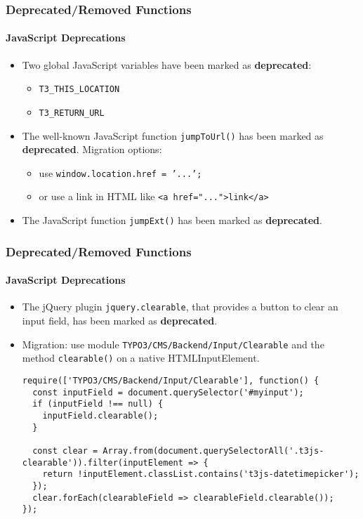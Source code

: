 \begin{frame}[fragile]
	\frametitle{Deprecated/Removed Functions}
	\framesubtitle{JavaScript Deprecations}

	\begin{itemize}
		\item Two global JavaScript variables have been marked as \textbf{deprecated}:

			\begin{itemize}
				\item \texttt{T3\_THIS\_LOCATION}
				\item \texttt{T3\_RETURN\_URL}
			\end{itemize}

		\item The well-known JavaScript function \texttt{jumpToUrl()} has been marked as \textbf{deprecated}.
			Migration options:

			\begin{itemize}
				\item use \texttt{window.location.href = '...';}
				\item or use a link in HTML like \texttt{<a href="...">link</a>}
			\end{itemize}

		\item The JavaScript function \texttt{jumpExt()} has been marked as \textbf{deprecated}.

	\end{itemize}

\end{frame}


\begin{frame}[fragile]
	\frametitle{Deprecated/Removed Functions}
	\framesubtitle{JavaScript Deprecations}

	\lstset{basicstyle=\tiny\ttfamily}

	\begin{itemize}
		\item The jQuery plugin \texttt{jquery.clearable},
			that provides a button to clear an input field, has been marked as \textbf{deprecated}.
		\item Migration: use module \small\texttt{TYPO3/CMS/Backend/Input/Clearable}\normalsize
			and the method \texttt{clearable()} on a native HTMLInputElement.
\begin{lstlisting}
require(['TYPO3/CMS/Backend/Input/Clearable'], function() {
  const inputField = document.querySelector('#myinput');
  if (inputField !== null) {
    inputField.clearable();
  }

  const clear = Array.from(document.querySelectorAll('.t3js-clearable')).filter(inputElement => {
    return !inputElement.classList.contains('t3js-datetimepicker');
  });
  clear.forEach(clearableField => clearableField.clearable());
});
\end{lstlisting}

	\end{itemize}

\end{frame}

